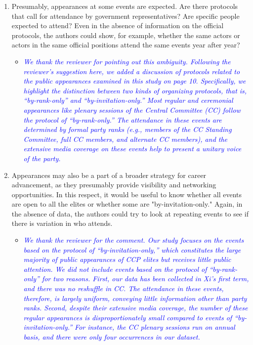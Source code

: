 \begin{enumerate}
 \item Presumably, appearances at some events are expected. Are there protocols that call for attendance by government representatives? Are specific people expected to attend?  Even in the absence of information on the official protocols, the authors could show, for example, whether the same actors or actors in the same official positions attend the same events year after year?
	\begin{itemize}
		\item \textcolor{blue}{ \emph{
			We thank the reviewer for pointing out this ambiguity.  Following the reviewer's suggestion here, we added a discussion of protocols related to the public appearances examined in this study on page 10.  Specifically, we highlight the distinction between two kinds of organizing protocols, that is, “by-rank-only” and “by-invitation-only.”  Most regular and ceremonial appearances like plenary sessions of the Central Committee (CC) follow the protocol of “by-rank-only.”  The attendance in these events are determined by formal party ranks (e.g., members of the CC Standing Committee, full CC members, and alternate CC members), and the extensive media coverage on these events help to present a unitary voice of the party.
		}}
	\end{itemize}
	\item Appearances may also be a part of a broader strategy for career advancement, as they presumably provide visibility and networking opportunities. In this respect, it would be useful to know whether all events are open to all the elites or whether some are "by-invitation-only."  Again, in the absence of data, the authors could try to look at repeating events to see if there is variation in who attends.
	\begin{itemize}
		\item \textcolor{blue}{ \emph{
			We thank the reviewer for the comment. Our study focuses on the events based on the protocol of “by-invitation-only,” which constitutes the large majority of public appearances of CCP elites but receives little public attention.  We did not include events based on the protocol of “by-rank-only” for two reasons.  First, our data has been collected in Xi’s first term, and there was no reshuffle in CC.  The attendance in these events, therefore, is largely uniform, conveying little information other than party ranks.  Second, despite their extensive media coverage, the number of these regular appearances is disproportionately small compared to events of “by-invitation-only.”  For instance, the CC plenary sessions run on annual basis, and there were only four occurrences in our dataset.
}}
\end{itemize}
\end{enumerate}

